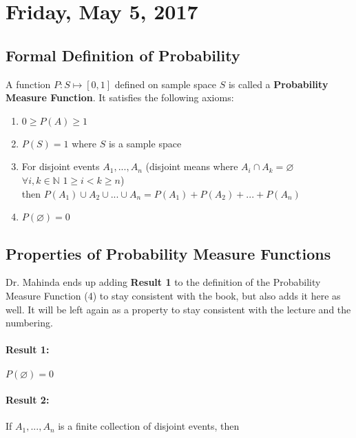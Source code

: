 \documentclass[12pt, twoside]{article}
\begin{document}
\newpage

\section{Friday, May 5, 2017}

\subsection{Formal Definition of Probability}

\begin{tcolorbox}[title= Probability Measure Function (PMF)]

A function $P:S\longmapsto [0,1]$ defined on sample space $S$ is called a \textbf{Probability Measure Function}. It satisfies the following axioms:
\begin{enumerate}
	\item{$0 \geq P(A) \geq 1$}
	\item{$P(S) = 1$ where $S$ is a sample space}
	\item{
	For disjoint events $A_1, ... , A_n$ (disjoint means where $A_i \cap A_k = \varnothing$\\
	$\forall i,k \in\mathbb{N}$ $1 \geq i < k \geq n$)\\
	then $P(A_1) \cup A_2 \cup ... \cup A_n = P(A_1) + P(A_2) + ... + P(A_n)$
	}
	\item{$P(\varnothing) = 0$}
\end{enumerate}
\end{tcolorbox}

\subsection{Properties of Probability Measure Functions}

Dr. Mahinda ends up adding \textbf{Result 1} to the definition of the Probability Measure Function (4) to stay consistent with the book, but also adds it here as well. It will be left again as a property to stay consistent with the lecture and the numbering.

\paragraph{Result 1:} $P(\varnothing) = 0$
\paragraph{Result 2:} If $A_1, ... , A_n$ is a finite collection of disjoint events, then
\end{document}
